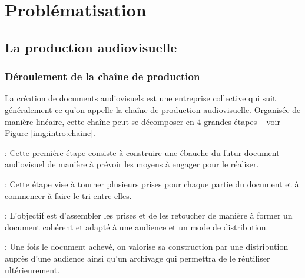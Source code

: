 
\chapter{Problématisation}\label{chap:problo}
\minitoc
\section{La production audiovisuelle}\label{sec:metier}


\subsection{Déroulement de la chaîne de production}\label{sec:prod}
La création de documents audiovisuels est une entreprise collective qui suit généralement ce qu'on appelle la chaîne de production audiovisuelle. 
Organisée de manière linéaire, cette chaîne peut se décomposer en 4 grandes étapes -- voir Figure \ref{img:intro:chaine}.

\begin{liste} 
	\item {} : Cette première étape consiste à construire une ébauche du futur document audiovisuel de manière à prévoir les moyens à engager pour le réaliser.

	\item {} : Cette étape vise à tourner plusieurs prises pour chaque partie du document et à commencer à faire le tri entre elles.

	\item {} : L'objectif est d'assembler les prises et de les retoucher de manière à former un document cohérent et adapté à une audience et un mode de distribution.

	\item {} : Une fois le document achevé, on valorise sa construction par une distribution auprès d'une audience ainsi qu'un archivage qui permettra de le réutiliser ultérieurement.
\end{liste}

